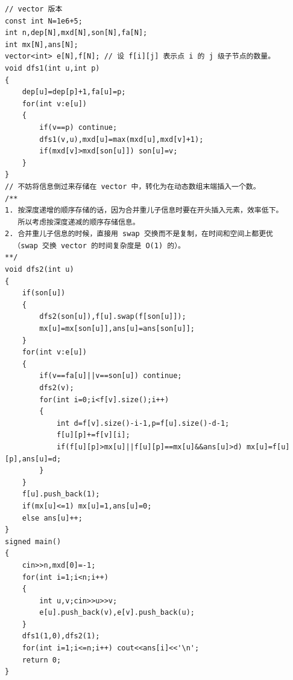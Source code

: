 \begin{verbatim}
// vector 版本
const int N=1e6+5;
int n,dep[N],mxd[N],son[N],fa[N];
int mx[N],ans[N];
vector<int> e[N],f[N]; // 设 f[i][j] 表示点 i 的 j 级子节点的数量。
void dfs1(int u,int p)
{
    dep[u]=dep[p]+1,fa[u]=p;
    for(int v:e[u])
    {
        if(v==p) continue;
        dfs1(v,u),mxd[u]=max(mxd[u],mxd[v]+1);
        if(mxd[v]>mxd[son[u]]) son[u]=v;
    }
}
// 不妨将信息倒过来存储在 vector 中，转化为在动态数组末端插入一个数。
/**
1. 按深度递增的顺序存储的话，因为合并重儿子信息时要在开头插入元素，效率低下。
   所以考虑按深度递减的顺序存储信息。
2. 合并重儿子信息的时候，直接用 swap 交换而不是复制，在时间和空间上都更优
  （swap 交换 vector 的时间复杂度是 O(1) 的）。
**/
void dfs2(int u)
{
    if(son[u])
    {
        dfs2(son[u]),f[u].swap(f[son[u]]);
        mx[u]=mx[son[u]],ans[u]=ans[son[u]];
    }
    for(int v:e[u])
    {
        if(v==fa[u]||v==son[u]) continue;
        dfs2(v);
        for(int i=0;i<f[v].size();i++)
        {
            int d=f[v].size()-i-1,p=f[u].size()-d-1;
            f[u][p]+=f[v][i];
            if(f[u][p]>mx[u]||f[u][p]==mx[u]&&ans[u]>d) mx[u]=f[u][p],ans[u]=d;
        }
    } 
    f[u].push_back(1);
    if(mx[u]<=1) mx[u]=1,ans[u]=0;
    else ans[u]++;
}
signed main()
{
    cin>>n,mxd[0]=-1;
    for(int i=1;i<n;i++)
    {
        int u,v;cin>>u>>v;
        e[u].push_back(v),e[v].push_back(u);
    } 
    dfs1(1,0),dfs2(1);
    for(int i=1;i<=n;i++) cout<<ans[i]<<'\n';
    return 0;
}
\end{verbatim}